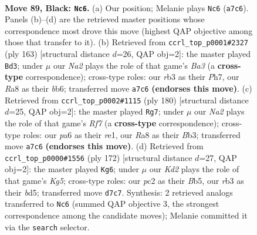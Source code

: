\documentclass[11pt]{article}
\begin{document}
\clearpage

\begin{figure}[p]\centering
\begin{subfigure}{0.46\textwidth}\centering
\resizebox{\linewidth}{!}{%
\newchessgame
\chessboard[
  setfen={r7/n2k4/P7/8/8/1R4PP/2P1B3/4K3 b - - 12 89},
  showmover=false,
  pgfstyle=straightmove, color=movearrow, markmove={a7-c6}
]}
\caption{}
\end{subfigure}\hfill
\begin{subfigure}{0.46\textwidth}\centering
\resizebox{\linewidth}{!}{%
\newchessgame
\chessboard[
  setfen={8/3k3p/bB6/P3n1P1/7K/8/6B1/8 b - - 4 82},
  showmover=false,
  pgfstyle=straightmove, color=movearrow, markmove={a6-d3}
]}
\caption{}
\end{subfigure}
\\[4pt]
\begin{subfigure}{0.46\textwidth}\centering
\resizebox{\linewidth}{!}{%
\newchessgame
\chessboard[
  setfen={8/5R2/p7/1b3P1p/3K3k/1B6/8/4r3 w - - 0 91},
  showmover=false,
  pgfstyle=straightmove, color=movearrow, markmove={f7-g7}
]}
\caption{}
\end{subfigure}\hfill
\begin{subfigure}{0.46\textwidth}\centering
\resizebox{\linewidth}{!}{%
\newchessgame
\chessboard[
  setfen={5k2/R7/1p2p3/1B1bb1K1/8/P7/8/8 w - - 6 87},
  showmover=false,
  pgfstyle=straightmove, color=movearrow, markmove={g5-g6}
]}
\caption{}
\end{subfigure}
\caption{\textbf{Move 89, Black: \texttt{Nc6}.} (a) Our position; Melanie plays \texttt{Nc6} (\texttt{a7c6}). Panels (b)--(d) are the retrieved master positions whose correspondence most drove this move (highest QAP objective among those that transfer to it). (b) Retrieved from \texttt{ccrl\_top\_p0001\#2327} (ply 163) [structural distance $d$=26, QAP obj=2]: the master played \texttt{Bd3}; under $\mu$ our \emph{Na2} plays the role of that game's \emph{Ba3} (a \textbf{cross-type} correspondence); cross-type roles: our \emph{r}b3 as their \emph{P}h7, our \emph{R}a8 as their \emph{b}b6; transferred move \texttt{a7c6} \textbf{(endorses this move)}. (c) Retrieved from \texttt{ccrl\_top\_p0002\#1115} (ply 180) [structural distance $d$=25, QAP obj=2]: the master played \texttt{Rg7}; under $\mu$ our \emph{Na2} plays the role of that game's \emph{Rf7} (a \textbf{cross-type} correspondence); cross-type roles: our \emph{p}a6 as their \emph{r}e1, our \emph{R}a8 as their \emph{B}b3; transferred move \texttt{a7c6} \textbf{(endorses this move)}. (d) Retrieved from \texttt{ccrl\_top\_p0000\#1556} (ply 172) [structural distance $d$=27, QAP obj=2]: the master played \texttt{Kg6}; under $\mu$ our \emph{Kd2} plays the role of that game's \emph{Kg5}; cross-type roles: our \emph{p}c2 as their \emph{B}b5, our \emph{r}b3 as their \emph{b}d5; transferred move \texttt{d7c7}. Synthesis: 2 retrieved analogs transferred to \texttt{Nc6} (summed QAP objective 3, the strongest correspondence among the candidate moves); Melanie committed it via the \texttt{search} selector.}
\label{fig:thought-m177}
\end{figure}
\end{document}
